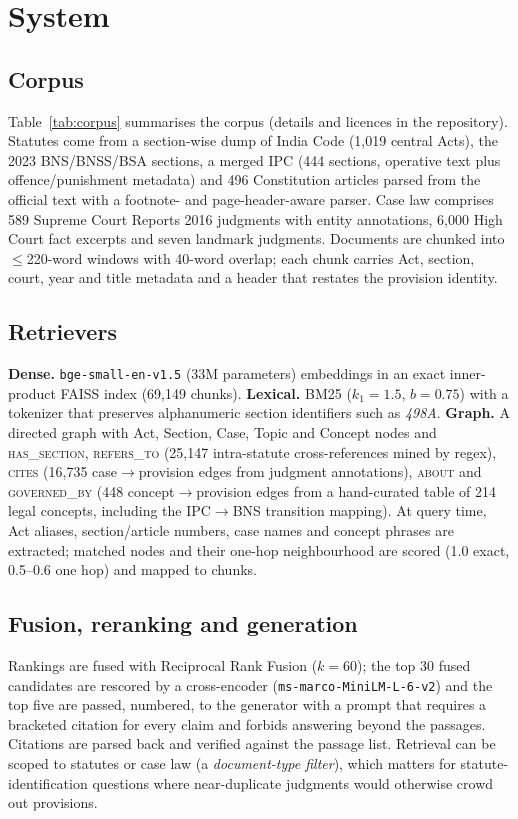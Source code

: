 \documentclass[conference]{IEEEtran}
\begin{document}
\section{System}
\subsection{Corpus}
Table~\ref{tab:corpus} summarises the corpus (details and licences in the repository). Statutes come from a section-wise dump of India Code (1,019 central Acts), the 2023 BNS/BNSS/BSA sections, a merged IPC (444 sections, operative text plus offence/punishment metadata) and 496 Constitution articles parsed from the official text with a footnote- and page-header-aware parser. Case law comprises 589 Supreme Court Reports 2016 judgments with entity annotations, 6,000 High Court fact excerpts and seven landmark judgments. Documents are chunked into $\le$220-word windows with 40-word overlap; each chunk carries Act, section, court, year and title metadata and a header that restates the provision identity.

\subsection{Retrievers}
\textbf{Dense.} \texttt{bge-small-en-v1.5} (33M parameters) embeddings in an exact inner-product FAISS index (69,149 chunks). \textbf{Lexical.} BM25 ($k_1{=}1.5$, $b{=}0.75$) with a tokenizer that preserves alphanumeric section identifiers such as \emph{498A}. \textbf{Graph.} A directed graph with Act, Section, Case, Topic and Concept nodes and \textsc{has\_section}, \textsc{refers\_to} (25,147 intra-statute cross-references mined by regex), \textsc{cites} (16,735 case$\to$provision edges from judgment annotations), \textsc{about} and \textsc{governed\_by} (448 concept$\to$provision edges from a hand-curated table of 214 legal concepts, including the IPC$\to$BNS transition mapping). At query time, Act aliases, section/article numbers, case names and concept phrases are extracted; matched nodes and their one-hop neighbourhood are scored (1.0 exact, 0.5--0.6 one hop) and mapped to chunks.

\subsection{Fusion, reranking and generation}
Rankings are fused with Reciprocal Rank Fusion ($k{=}60$); the top 30 fused candidates are rescored by a cross-encoder (\texttt{ms-marco-MiniLM-L-6-v2}) and the top five are passed, numbered, to the generator with a prompt that requires a bracketed citation for every claim and forbids answering beyond the passages. Citations are parsed back and verified against the passage list. Retrieval can be scoped to statutes or case law (a \emph{document-type filter}), which matters for statute-identification questions where near-duplicate judgments would otherwise crowd out provisions.
\end{document}
